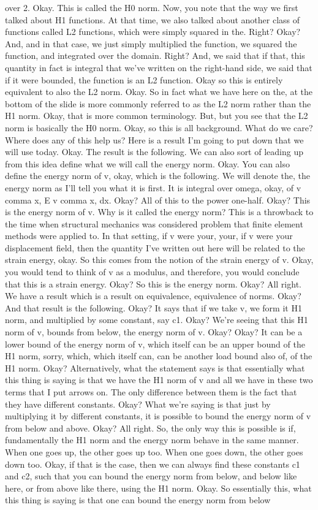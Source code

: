 \documentclass[10pt]{article}
\begin{document}
{over 2. Okay. This is called the H0 norm. Now, you note that the way we first talked about H1 functions. At that time, we also talked about another class of functions called L2 functions, which were simply squared in the. Right? Okay? And, and in that case, we just simply multiplied the function, we squared the function, and integrated over the domain. Right? And, we said that if that, this quantity in fact is integral that we've written on the right-hand side, we said that if it were bounded, the function is an L2 function. Okay so this is entirely equivalent to also the L2 norm. Okay. So in fact what we have here on the, at the bottom of the slide is more commonly referred to as the L2 norm rather than the H1 norm. Okay, that is more common terminology. But, but you see that the L2 norm is basically the H0 norm. Okay, so this is all background. What do we care? Where does any of this help us? Here is a result I'm going to put down that we will use today. Okay. The result is the following. We can also sort of leading up from this idea define what we will call the energy norm. Okay. You can also define the energy norm of v, okay, which is the following. We will denote the, the energy norm as I'll tell you what it is first. It is integral over omega, okay, of v comma x, E v comma x, dx. Okay? All of this to the power one-half. Okay? This is the energy norm of v. Why is it called the energy norm? This is a throwback to the time when structural mechanics was considered problem that finite element methods were applied to. In that setting, if v were your, your, if v were your displacement field, then the quantity I've written out here will be related to the strain energy, okay. So this comes from the notion of the strain energy of v. Okay, you would tend to think of v as a modulus, and therefore, you would conclude that this is a strain energy. Okay? So this is the energy norm. Okay? All right. We have a result which is a result on equivalence, equivalence of norms. Okay? And that result is the following. Okay? It says that if we take v, we form it H1 norm, and multiplied by some constant, say c1. Okay? We're seeing that this H1 norm of v, bounds from below, the energy norm of v. Okay? Okay? It can be a lower bound of the energy norm of v, which itself can be an upper bound of the H1 norm, sorry, which, which itself can, can be another load bound also of, of the H1 norm. Okay? Alternatively, what the statement says is that essentially what this thing is saying is that we have the H1 norm of v and all we have in these two terms that I put arrows on. The only difference between them is the fact that they have different constants. Okay? What we're saying is that just by multiplying it by different constants, it is possible to bound the energy norm of v from below and above. Okay? All right. So, the only way this is possible is if, fundamentally the H1 norm and the energy norm behave in the same manner. When one goes up, the other goes up too. When one goes down, the other goes down too. Okay, if that is the case, then we can always find these constants c1 and c2, such that you can bound the energy norm from below, and below like here, or from above like there, using the H1 norm. Okay. So essentially this, what this thing is saying is that one can bound the energy norm from below }
\end{document}

